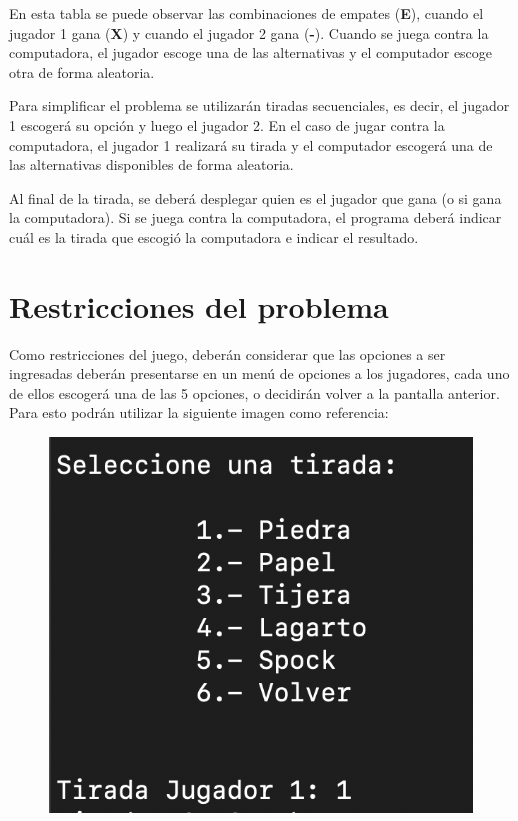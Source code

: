 \documentclass[]{article}
\begin{document}
    En esta tabla se puede observar las combinaciones de empates (\textbf{E}), cuando el jugador 1 gana (\textbf{X}) y cuando el jugador 2 gana (\textbf{-}). Cuando se juega contra la computadora, el jugador escoge una de las alternativas y el computador escoge otra de forma aleatoria.

    Para simplificar el problema se utilizarán tiradas secuenciales, es decir, el jugador 1 escogerá su opción y luego el jugador 2. En el caso de jugar contra la computadora, el jugador 1 realizará su tirada y el computador escogerá una de las alternativas disponibles de forma aleatoria.

    Al final de la tirada, se deberá desplegar quien es el jugador que gana (o si gana la computadora). Si se juega contra la computadora, el programa deberá indicar cuál es la tirada que escogió la computadora e indicar el resultado.

    \section{Restricciones del problema}
    Como restricciones del juego, deberán considerar que las opciones a ser ingresadas deberán presentarse en un menú de opciones a los jugadores, cada uno de ellos escogerá una de las 5 opciones, o decidirán volver a la pantalla anterior. Para esto podrán utilizar la siguiente imagen como referencia:

    \begin{figure}[H]
        \includegraphics[scale=0.5]{ejMenuJugador}
    \end{figure}
\end{document}
